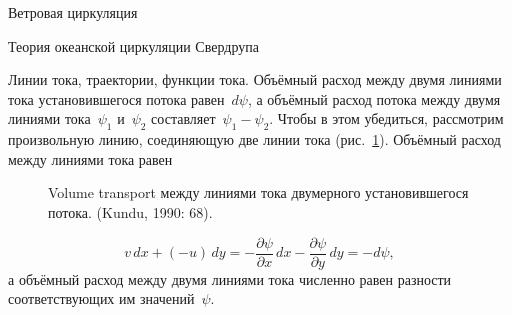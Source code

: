 \begin{chapter}{Ветровая циркуляция}
\begin{section}{Теория океанской циркуляции Свердрупа}
\begin{paragraph}{Линии тока, траектории, функции тока.}
Объёмный расход между двумя линиями тока установившегося потока 
равен~$d\psi$, а объёмный расход потока между двумя линиями тока~$\psi_1$ 
и~$\psi _2$ составляет~$\psi _1 - \psi _2$. Чтобы в этом убедиться,
рассмотрим произвольную линию, соединяющую две линии тока
(рис.~\ref{fig:volxportsketch}). Объёмный расход между линиями тока равен
%
%
\begin{figure}[t!]
\caption{Volume transport между линиями тока
двумерного установившегося потока. (Kundu, 1990: 68).}
\label{fig:volxportsketch}
\end{figure}
%
%
%
\begin{equation}
v\,dx+(-u)\,dy=-\frac{\partial{\psi}}{\partial{x}}\,dx-\frac{\partial{\psi}}{\partial{y}}\,dy=-d\psi,
\end{equation}
а объёмный расход между двумя линиями тока численно равен разности 
соответствующих им значений~$\psi$.
%


\end{paragraph}
\end{section}
\end{chapter}
